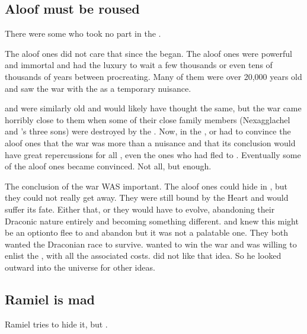 \subsection{Aloof \dragons must be roused}
There were some  who took no part in the \feud.

The aloof ones did not care that  since the  began.
The aloof ones were powerful and immortal and had the luxury to wait a few thousands or even tens of thousands of years between procreating. Many of them were over 20,000 years old and saw the war with the \resphain as a temporary nuisance. 

\Ishnaruchaefir and \Secherdamon were similarly old and would likely have thought the same, but the war came horribly close to them when some of their close family members (Nexagglachel and \Ishnaruchaefir's three sons) were destroyed by the \resphain.
Now, in the \thirdbanewar, \Secherdamon or \Ishnaruchaefir had to convince the aloof ones that the war was more than a nuisance and that its conclusion would have great repercussions for all \dragons, even the ones who had fled to \Machai.
Eventually some of the aloof ones became convinced. 
Not all, but enough.

The conclusion of the war WAS important.
The aloof ones could hide in \Machai, but they could not really get away. 
They were still bound by the Heart and would suffer its fate.
Either that, or they would have to evolve, abandoning their Draconic nature entirely and becoming something different.
\Ishnaruchaefir and \Secherdamon knew this might be an option\dash{}to flee to \Machai and abandon \dragonkind\dash{}but it was not a palatable one. 
They both wanted the Draconian race to survive.
\Secherdamon wanted to win the war and was willing to enlist the \xs, with all the associated costs.
\Ishnaruchaefir did not like that idea.
So he looked outward into the universe for other ideas.









\subsection{Ramiel is mad}
Ramiel tries to hide it, but . 









